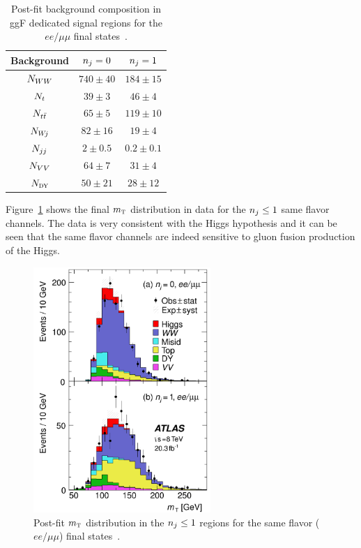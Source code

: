 \begin{table}[h!]
\centering
\captionsetup{justification=centering}

\hspace{-10pt}
\begin{tabular}{|c|c|c|}
\hline
Background & $n_j = 0$ & $n_j = 1$ \\ \hline
$N_{WW}$ & $740 \pm 40$ & $184 \pm 15$ \\ \hline
$N_{t}$ & $39 \pm 3$ & $46 \pm 4$ \\ \hline
$N_{t\bar{t}}$ & $65 \pm 5$ & $119 \pm 10$ \\ \hline
$N_{W\!j}$ & $82 \pm 16$ & $19 \pm 4$ \\ \hline
$N_{jj}$ & $2 \pm 0.5$ & $0.2 \pm 0.1$ \\ \hline
$N_{VV}$ & $64 \pm 7$ & $31 \pm 4$ \\ \hline
$N_{{\textsc{\footnotesize dy}}}$ & $50 \pm 21$ & $28 \pm 12$ \\ \hline
\end{tabular}

\caption{
Post-fit background composition in ggF dedicated signal regions for the $ee/\mu\mu$ final states~\cite{WW2015}. 
}
\label{tab:ggF_sf_bkg}
\end{table}

Figure~\ref{fig:ggF_mT_sf} shows the final $m_{\textrm{\footnotesize\sc t}}$ distribution in data for the $n_j \leq 1$ same flavor channels. The data is very consistent with the Higgs hypothesis and it can be seen that the same flavor channels are indeed sensitive to gluon fusion production of the Higgs. 

\begin{figure}[h!]
  \centering
  \captionsetup{justification=centering}

  \includegraphics[width=0.6\textwidth]{figures/ggF_mT_sameflavor}
  \caption{Post-fit $m_{\textrm{\footnotesize\sc t}}$ distribution in the $n_j \leq 1$ regions for the same flavor ($ee/\mu\mu$) final states~\cite{WW2015}.}
  \label{fig:ggF_mT_sf}
\end{figure}


